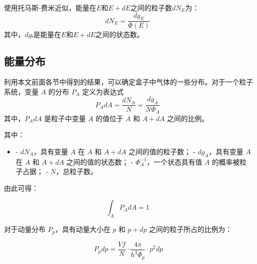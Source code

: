 使用托马斯-费米近似，能量在\(E\)和\(E+dE\)之间的粒子数\(dN_E\)为：
\[
dN_E = \frac{dg_E}{\Phi(E)}~
\]
其中，\(dg\)ₑ是能量在\(E\)和\(E+dE\)之间的状态数。
\subsection{能量分布}  
利用本文前面各节中得到的结果，可以确定盒子中气体的一些分布。对于一个粒子系统，变量 \( A \) 的分布 \( P_A \) 定义为表达式  
\[
P_A dA = \frac{dN_A}{N} = \frac{dg_A}{N \Phi_A}~
\]
其中，\( P_A dA \) 是粒子中变量 \( A \) 的值位于 \( A \) 和 \( A + dA \) 之间的比例。

其中：

\begin{itemize}
\item - \( dN_A \)，具有变量 \( A \) 在 \( A \) 和 \( A + dA \) 之间的值的粒子数；
- \( dg_A \)，具有变量 \( A \) 在 \( A \) 和 \( A + dA \) 之间的值的状态数；
- \( \Phi_A^{-1} \)，一个状态具有值 \( A \) 的概率被粒子占据；
- \( N \)，总粒子数。
\end{itemize}

由此可得：

\[
\int_A P_A dA = 1~
\]

对于动量分布 \( P_p \)，具有动量大小在 \( p \) 和 \( p + dp \) 之间的粒子所占的比例为：

\[
P_p dp = \frac{Vf}{N} \cdot \frac{4\pi}{h^3 \Phi_p} \cdot p^2 dp
\]